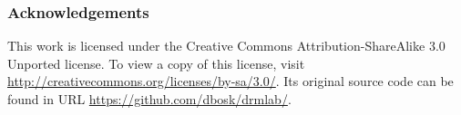 \subsubsection*{Acknowledgements}

This work is licensed under the Creative Commons Attribution-ShareAlike 3.0 
Unported license.
To view a copy of this license, visit 
\url{http://creativecommons.org/licenses/by-sa/3.0/}.
Its original source code can be found in URL 
\url{https://github.com/dbosk/drmlab/}.


\printbibliography{}
